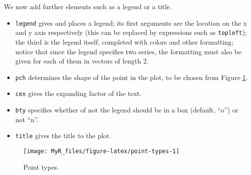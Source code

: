\documentclass[]{book}
\providecommand{\tightlist}{%
  \setlength{\itemsep}{0pt}\setlength{\parskip}{0pt}}
\theoremstyle{definition}
\theoremstyle{definition}
\theoremstyle{definition}
\theoremstyle{remark}
\begin{document}
We now add further elements such as a legend or a title.

\begin{itemize}
\tightlist
\item
  \texttt{legend} gives and places a legend; its first arguments are the
  location on the x and y axis respectively (this can be replaced by
  expressions such as \texttt{topleft}); the third is the legend itself,
  completed with colors and other formatting; notice that since the
  legend specifies two series, the formatting must also be given for
  each of them in vectors of length 2.
\item
  \texttt{pch} determines the shape of the point in the plot, to be
  chosen from Figure \ref{fig:point-types}.
\item
  \texttt{cex} gives the expanding factor of the text.
\item
  \texttt{bty} specifies whether of not the legend should be in a box
  (default, ``o'') or not ``n''.
\item
  \texttt{title} gives the title to the plot.
\end{itemize}

\begin{figure}

{\centering \texttt{[image: MyR\_files/figure-latex/point-types-1]} 

}

\caption{Point types.}\label{fig:point-types}
\end{figure}
\end{document}
